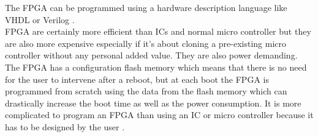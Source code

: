The FPGA can be programmed using a hardware description language like VHDL or Verilog \citep {FPGA_youtube} \citep{FPGA_center} \citep{FPGA_toronto}. \\

FPGA are certainly more efficient than ICs and normal micro controller but they are also more expensive especially if it’s about cloning a pre-existing micro controller without any personal added value. They are also power demanding. The FPGA has a configuration flash memory which means that there is no need for the user to intervene after a reboot, but at each boot the FPGA is programmed from scratch using the data from the flash memory which can drastically increase the boot time as well as the power consumption. It is more complicated to program an FPGA than using an IC or micro controller because it has to be designed by the user \citep {FPGA_youtube} \citep{FPGA_center} \citep{FPGA_toronto}. \\








